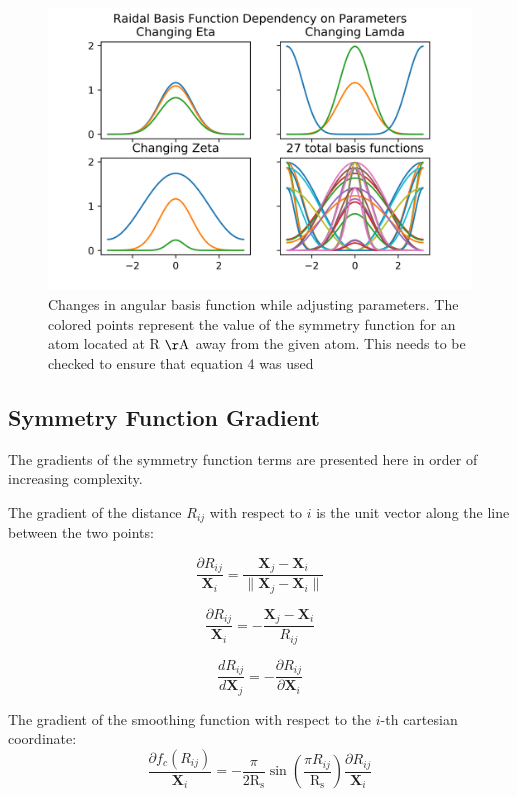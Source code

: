 \documentclass{article}
\newcommand{\mb}[1]{\mathbf{#1}}
\begin{document}
\begin{figure}
	\includegraphics[width=\linewidth]{./img/ang_graphs.png}	\caption{Changes in angular basis function while adjusting parameters. The colored points represent the value of the symmetry function for an atom located at R $\mathrm{\AA}$ away from the given atom. This needs to be checked to ensure that equation 4 was used}
	\label{fig:ang_funcs}
\end{figure}
\newpage
\subsection{Symmetry Function Gradient}
The gradients of the symmetry function terms are presented here in order of increasing complexity.

The gradient of the distance $R_{ij}$ with respect to $i$ is the unit vector along the line between the two points:

\begin{equation}
\frac{\partial R_{ij}}{\mb{X}_{i}} = \frac{\mathbf{X}_j-\mathbf{X}_i}{\lVert \mathbf{X}_j - \mathbf{X}_i \rVert}
\end{equation}

\begin{equation}
\frac{\partial R_{ij}}{\mb{X}_{i}} = -\frac{\mathbf{X}_j-\mathbf{X}_i}{R_{ij}}
\end{equation}

\begin{equation}
\frac{d R_{ij}}{d \mb{X}_{j}} = - \frac{\partial R_{ij}}{\partial\mb{X}_{i}}
\end{equation}

The gradient of the smoothing function with respect to the ${i}$-th cartesian coordinate:
\begin{equation}
\frac{\partial f_c (R_{ij}) } { \mb{X}_{i}} = -\frac{\pi}{2 
 \mathrm{R_s}}  \sin ( \frac{\pi R_{ij}}{\mathrm{R_s}}) \frac{\partial R_{ij}}{\mb{X}_{i}}
\end{equation}
\end{document}
